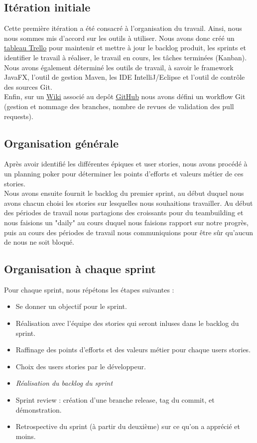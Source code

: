 \documentclass[10pt,a4paper]{article}
\begin{document}
\subsection{Itération initiale}
Cette première itération a été consacré à l'organisation du travail. Ainsi, nous nous sommes mis d'accord sur les outils à utiliser. Nous avons donc créé un \href{https://trello.com/b/HyinoLEE/navigateur}{\underline{tableau Trello}} pour maintenir et mettre à jour le backlog  produit, les sprints et identifier le travail à réaliser, le travail en cours, les tâches terminées (Kanban). \\ 
Nous avons également déterminé les outils de travail, à savoir le framework JavaFX, l'outil de gestion Maven, les IDE IntelliJ/Eclipse et l'outil de contrôle des sources Git. \\ 
Enfin, sur un \href{https://github.com/simjnd/navigateur/wiki}{\underline{Wiki}} associé au depôt \href{https://github.com/simjnd/navigateur}{\underline{GitHub}} nous avons défini un workflow Git (gestion et nommage des branches, nombre de revues de validation des pull requests). \\

\subsection{Organisation générale}

Après avoir identifié les différentes épiques et user stories, nous avons procédé à un planning poker pour déterminer les points d'efforts et valeurs métier de ces stories. \\
Nous avons ensuite fournit le backlog du premier sprint, au début duquel nous avons chacun choisi les stories sur lesquelles nous souhaitions travailler. Au début des périodes de travail nous partagions des croissants pour du teambuilding et nous faisions un "daily" au cours duquel nous faisions rapport sur notre progrès, puis au cours des périodes de travail nous communiquions pour être sûr qu'aucun de nous ne soit bloqué.

\subsection{Organisation à chaque sprint}
Pour chaque sprint, nous répétons les étapes suivantes :
\begin{itemize}
\item Se donner un objectif pour le sprint.
\item Réalisation avec l'équipe des stories qui seront inluses dans le backlog du sprint.
\item Raffinage des points d'efforts et des valeurs métier pour chaque users stories.
\item Choix des users stories par le développeur.
\item \textit{Réalisation du backlog du sprint}
\item Sprint review : création d'une branche release, tag du commit, et démonstration.
\item Retrospective du sprint (à partir du deuxième) sur ce qu'on a apprécié et moins.
\end{itemize}
\end{document}
